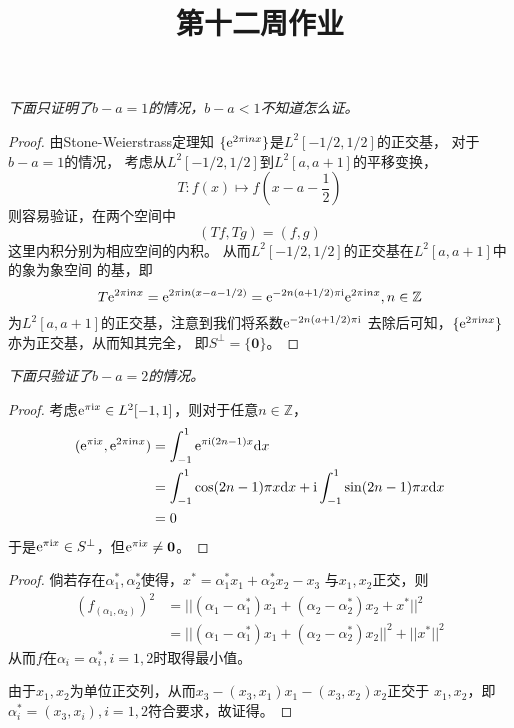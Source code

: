 \documentclass[cn]{homework}
\title{第十二周作业}
\newcommand{\img}{\mathrm i}
\begin{document}
    \maketitle

    \problem
    \begin{subproblem}[(\arabic*)]
        \item
        \emph{下面只证明了$b-a=1$的情况，$b-a<1$不知道怎么证。}
        \begin{proof}
            由Stone-Weierstrass定理知
            $\{\e^{2\pi\img nx}\}$是$L^2[-1/2,1/2]$的正交基，
            对于$b-a=1$的情况，
            考虑从$L^2[-1/2,1/2]$到$L^2[a,a+1]$的平移变换，
            \[T:f(x)\mapsto f(x-a-\frac{1}{2})\]
            则容易验证，在两个空间中
            \[(Tf,Tg)=(f,g)\]
            这里内积分别为相应空间的内积。
            从而$L^2[-1/2,1/2]$的正交基在$L^2[a,a+1]$中的象为象空间
            的基，即
            \[T\e^{2\pi\img nx}=\e^{2\pi\img n(x-a-1/2)}
            =\e^{-2n(a+1/2)\pi\img}\e^{2\pi\img nx},n\in\mathbb Z\]
            为$L^2[a,a+1]$的正交基，注意到我们将系数$\e^{-2n(a+1/2)\pi\img}$
            去除后可知，$\{\e^{2\pi\img nx}\}$亦为正交基，从而知其完全，
            即$S^\perp=\{\boldsymbol 0\}$。
        \end{proof}

        \item
        \emph{下面只验证了$b-a=2$的情况。}
        \begin{proof}
            考虑$\e^{\pi\img x}\in L^2[-1,1]$，则对于任意$n\in\mathbb Z$，
            \[\begin{aligned}
                (\e^{\pi\img x},\e^{2\pi\img nx})
                &=\int_{-1}^1\e^{\pi\img(2n-1)x}\diff x\\
                &=\int_{-1}^1\cos(2n-1)\pi x\diff x+\img\int_{-1}^1\sin(2n-1)\pi x\diff x\\
                &=0
            \end{aligned}\]
            于是$\e^{\pi\img x}\in S^\perp$，但$\e^{\pi\img x}\neq\boldsymbol 0$。
        \end{proof}
    \end{subproblem}

    \problem
    \begin{proof}
        倘若存在$\alpha_1^*,\alpha_2^*$使得，$x^*=\alpha_1^*x_1+\alpha_2^*x_2-x_3$
        与$x_1,x_2$正交，则
        \[\begin{aligned}
            (f_(\alpha_1,\alpha_2))^2
            &=||(\alpha_1-\alpha_1^*)x_1+(\alpha_2-\alpha_2^*)x_2+x^*||^2\\
            &=||(\alpha_1-\alpha_1^*)x_1+(\alpha_2-\alpha_2^*)x_2||^2
            +||x^*||^2
        \end{aligned}\]
        从而$f$在$\alpha_i=\alpha_i^*,i=1,2$时取得最小值。

        由于$x_1,x_2$为单位正交列，从而$x_3-(x_3,x_1)x_1-(x_3,x_2)x_2$正交于
        $x_1,x_2$，即$\alpha_i^*=(x_3,x_i),i=1,2$符合要求，故证得。
    \end{proof}
\end{document}
